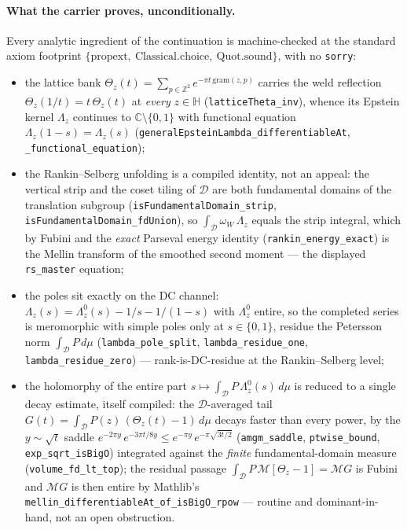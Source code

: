 \documentclass[11pt]{article}
\theoremstyle{definition}
\begin{document}
\paragraph{What the carrier proves, unconditionally.} Every analytic ingredient of the
continuation is machine-checked at the standard axiom footprint
$\{\mathrm{propext},\ \mathrm{Classical.choice},\ \mathrm{Quot.sound}\}$, with no \texttt{sorry}:
\begin{itemize}
\item the lattice bank $\Theta_z(t)=\sum_{p\in\mathbb Z^2}e^{-\pi t\,\mathrm{gram}(z,p)}$ carries
the weld reflection $\Theta_z(1/t)=t\,\Theta_z(t)$ at \emph{every} $z\in\mathbb H$
(\texttt{latticeTheta\_inv}), whence its Epstein kernel $\Lambda_z$ continues to
$\mathbb C\setminus\{0,1\}$ with functional equation $\Lambda_z(1-s)=\Lambda_z(s)$
(\texttt{generalEpsteinLambda\_differentiableAt}, \texttt{\_functional\_equation});
\item the Rankin--Selberg unfolding is a compiled identity, not an appeal: the vertical strip and
the coset tiling of $\mathcal D$ are both fundamental domains of the translation subgroup
(\texttt{isFundamentalDomain\_strip}, \texttt{isFundamentalDomain\_fdUnion}), so
$\int_{\mathcal D}\omega_W\,\Lambda_z$ equals the strip integral, which by Fubini and the
\emph{exact} Parseval energy identity (\texttt{rankin\_energy\_exact}) is the Mellin transform of
the smoothed second moment --- the displayed \texttt{rs\_master} equation;
\item the poles sit exactly on the DC channel: $\Lambda_z(s)=\Lambda_z^{0}(s)-1/s-1/(1-s)$ with
$\Lambda_z^{0}$ entire, so the completed series is meromorphic with simple poles only at
$s\in\{0,1\}$, residue the Petersson norm $\int_{\mathcal D}P\,d\mu$ (\texttt{lambda\_pole\_split},
\texttt{lambda\_residue\_one}, \texttt{lambda\_residue\_zero}) --- rank-is-DC-residue at the
Rankin--Selberg level;
\item the holomorphy of the entire part $s\mapsto\int_{\mathcal D}P\,\Lambda_z^{0}(s)\,d\mu$ is
reduced to a single decay estimate, itself compiled: the $\mathcal D$-averaged tail
$G(t)=\int_{\mathcal D}P(z)\,(\Theta_z(t)-1)\,d\mu$ decays faster than every power, by the
$y\sim\sqrt t$ saddle $e^{-2\pi y}\,e^{-3\pi t/8y}\le e^{-\pi y}\,e^{-\pi\sqrt{3t/2}}$
(\texttt{amgm\_saddle}, \texttt{ptwise\_bound}, \texttt{exp\_sqrt\_isBigO}) integrated against the
\emph{finite} fundamental-domain measure (\texttt{volume\_fd\_lt\_top}); the residual passage
$\int_{\mathcal D}P\,\mathcal M[\Theta_z-1]=\mathcal M G$ is Fubini and $\mathcal M G$ is then
entire by Mathlib's \texttt{mellin\_differentiableAt\_of\_isBigO\_rpow} --- routine and
dominant-in-hand, not an open obstruction.
\end{itemize}
\end{document}
